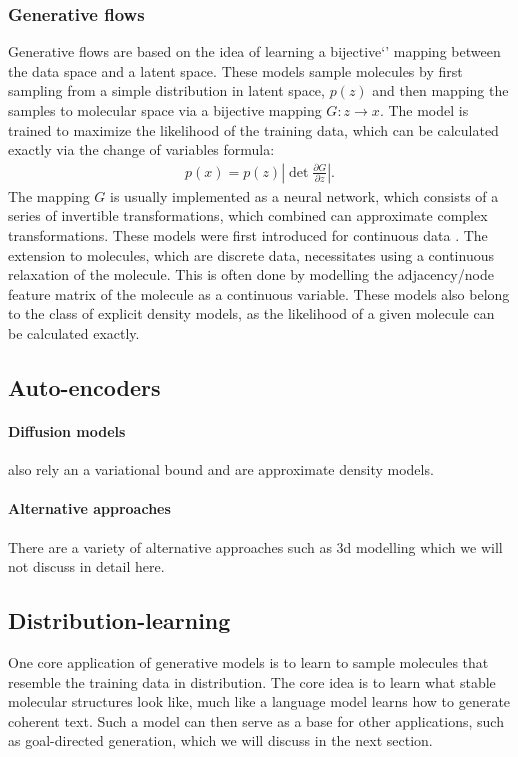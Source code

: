 \subsubsection{Generative flows}
Generative flows are based on the idea of learning a bijective`' mapping between the data space and
a latent space. These models sample molecules by first sampling from a simple distribution in latent
space, $p(z)$ and then mapping the samples to molecular space via a bijective mapping $G: z
      \rightarrow x$. The model is trained to maximize the likelihood of the training data, which can be
calculated exactly via the change of variables formula:
\begin{align}
      p(x) = p(z) \left| \det \frac{\partial G}{\partial z} \right|.
\end{align}
The mapping $G$ is usually implemented as a neural network, which consists of a series of invertible
transformations, which combined can approximate complex transformations. These models were first
introduced for continuous data \citet{rezendeVariationalInferenceNormalizing2016}. The extension to
molecules, which are discrete data, necessitates using a continuous relaxation of the molecule. This
is often done by modelling the adjacency/node feature matrix of the molecule as a continuous
variable. These models also belong to the class of explicit density models, as the likelihood of a
given molecule can be calculated exactly.

\subsection{Auto-encoders}
\citep{polykovskiyEntangledConditionalAdversarial2018,winterLearningContinuousDatadriven2019}

\paragraph{Diffusion models} also rely an a variational bound and are approximate density models.

\paragraph{Alternative approaches} There are a variety of alternative approaches such as 3d
modelling which we will not discuss in detail here.



\subsection{Distribution-learning}
One core application of generative models is to learn to sample molecules that resemble the training
data in distribution. The core idea is to learn what stable molecular structures look like, much
like a language model learns how to generate coherent text. Such a model can then serve as a base
for other applications, such as goal-directed generation, which we will discuss in the next section.

